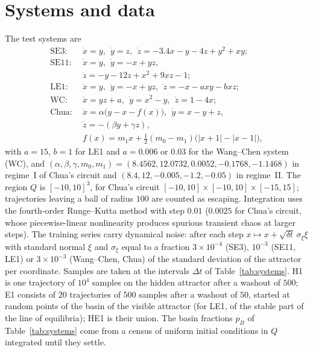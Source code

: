 \documentclass[aip,cha,reprint,amsmath,amssymb,longbibliography]{revtex4-2}
\theoremstyle{definition}
\begin{document}
\section{Systems and data}
\label{app:systems}

The test systems are\cite{Molaie2013,JafariSprott2013,WangChen2012,Leonov2011PLA,Stankevich2017}
\begin{align*}
\text{SE3:}\ \ &\dot x=y,\ \ \dot y=z,\ \ \dot z=-3.4x-y-4z+y^2+xy;\\
\text{SE11:}\ \ &\dot x=y,\ \ \dot y=-x+yz,\\
&\dot z=-y-12z+x^2+9xz-1;\\
\text{LE1:}\ \ &\dot x=y,\ \ \dot y=-x+yz,\ \ \dot z=-x-axy-bxz;\\
\text{WC:}\ \ &\dot x=yz+a,\ \ \dot y=x^2-y,\ \ \dot z=1-4x;\\
\text{Chua:}\ \ &\dot x=\alpha\bigl(y-x-f(x)\bigr),\ \ \dot y=x-y+z,\\
&\dot z=-(\beta y+\gamma z),\\
&f(x)=m_1x+\tfrac12(m_0-m_1)\bigl(|x+1|-|x-1|\bigr),
\end{align*}
with $a=15$, $b=1$ for LE1 and $a=0.006$ or $0.03$ for the Wang--Chen system (WC), and
$(\alpha,\beta,\gamma,m_0,m_1)=(8.4562,12.0732,0.0052,-0.1768,-1.1468)$ in regime~I of Chua's circuit and
$(8.4,12,-0.005,-1.2,-0.05)$ in regime~II. The region $Q$ is $[-10,10]^3$, for Chua's circuit
$[-10,10]\times[-10,10]\times[-15,15]$; trajectories leaving a ball of radius $100$ are counted as escaping. Integration uses
the fourth-order Runge--Kutta method with step $0.01$ ($0.0025$ for Chua's circuit, whose piecewise-linear nonlinearity
produces spurious transient chaos at larger steps). The training series carry dynamical noise: after each step
$x\mapsto x+\sqrt{\delta t}\,\sigma_\xi\xi$ with standard normal $\xi$ and $\sigma_\xi$ equal to a fraction $3\times10^{-4}$ (SE3),
$10^{-3}$ (SE11, LE1) or $3\times10^{-3}$ (Wang--Chen, Chua) of the standard deviation of the attractor per coordinate.
Samples are taken at the intervals $\Delta t$ of Table~\ref{tab:systems}. H1 is one trajectory of $10^4$ samples on the
hidden attractor after a washout of $500$; E1 consists of $20$ trajectories of $500$ samples after a washout of $50$,
started at random points of the basin of the visible attractor (for LE1, of the stable part of the line of equilibria);
HE1 is their union. The basin fractions $p_B$ of Table~\ref{tab:systems} come from a census of uniform initial conditions in
$Q$ integrated until they settle.
\end{document}
